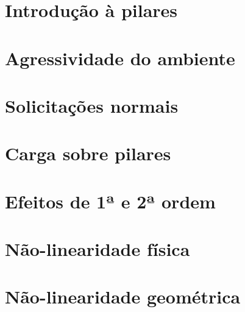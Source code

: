 \documentclass[12pt, a4paper]{article}
\begin{document}
	

	\section{Introdução à pilares}
	

	\section{Agressividade do ambiente}
	

	\section{Solicitações normais}
	

	\section{Carga sobre pilares}
	

	\section{Efeitos de 1ª e 2ª ordem}
	

	\section{Não-linearidade física}
	

	\section{Não-linearidade geométrica}
	
\end{document}
